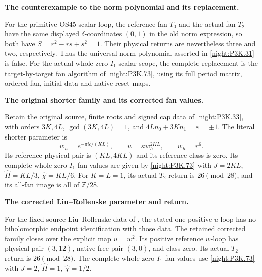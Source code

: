 \begin{proposition}\hypertarget{tag-01U8}{}\label{iv:correction:P3K.31}

\textbf{The counterexample to the norm polynomial and its replacement.}\par
For the primitive OS45 scalar loop, the reference fan
\(T_0\) and the actual fan \(T_2\) have the same displayed
\(\delta\)-coordinates \((0,1)\) in the old norm expression,
so both have \(S=r^2-rs+s^2=1\). Their physical returns are
nevertheless three and two, respectively. Thus the universal
norm polynomial asserted in \cref{night:P3K.31} is false.
For the actual whole-zero \(I_1\) scalar scope, the complete
replacement is the target-by-target fan algorithm of
\cref{night:P3K.73}, using its full period matrix, ordered fan,
initial data and native reset maps.
\end{proposition}

\begin{proposition}\hypertarget{tag-01UA}{}\label{iv:correction:P3K.33}

\textbf{The original shorter family and its corrected fan values.}\par
Retain the original source, finite roots and signed cap
data of \cref{night:P3K.33}, with orders \(3K,4L\),
\(\gcd(3K,4L)=1\), and \(4Ln_0+3Kn_1=\varepsilon=\pm1\).
The literal shorter parameter is
\[
 w_h=e^{-\pi i c/(KL)},\qquad u=\kappa w_h^{2KL},
 \qquad w_h=r^6.
\]
Its reference physical pair is \((KL,4KL)\) and its reference
class is zero. Its complete whole-zero \(I_1\) fan values are
given by \cref{night:P3K.73} with
\(J=2KL\), \(\widehat H=KL/3\), \(\widehat\chi=KL/6\).
For \(K=L=1\), its actual \(T_2\) return is \(26\pmod{28}\),
and its all-fan image is all of \(\mathbb Z/28\).
\end{proposition}

\begin{proposition}\hypertarget{tag-01UD}{}\label{iv:correction:P3K.36}

\textbf{The corrected Liu--Rollenske parameter and return.}\par
For the fixed-source Liu--Rollenske data of
, the stated one-positive-\(u\) loop has
no biholomorphic endpoint identification with those data. The
retained corrected family closes over the explicit map
\(u=w^2\). Its positive reference \(w\)-loop has physical
pair \((3,12)\), native free pair \((3,0)\), and class zero.
Its actual \(T_2\) return is \(26\pmod{28}\).
The complete whole-zero \(I_1\) fan values use
\cref{night:P3K.73} with \(J=2\),
\(\widehat H=1\), \(\widehat\chi=1/2\).
\end{proposition}

